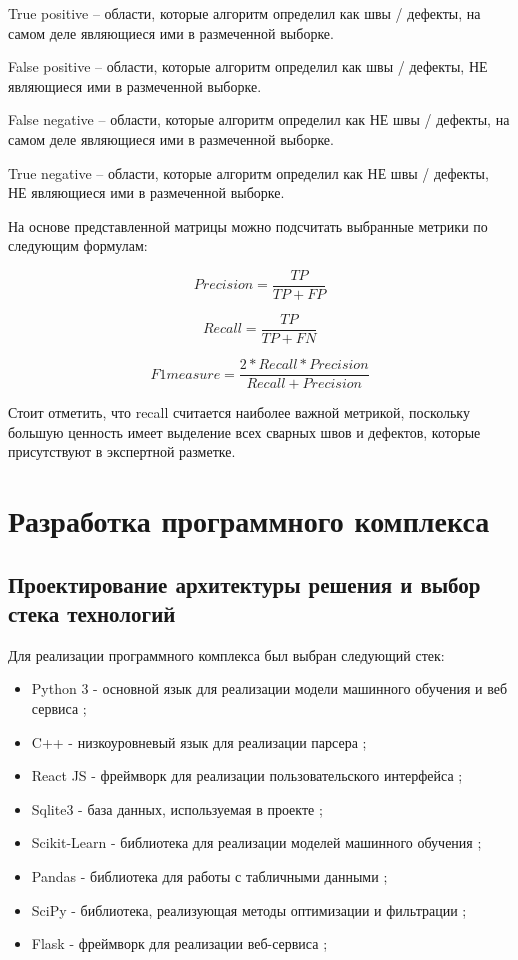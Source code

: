 \documentclass[a4paper,article,14pt]{extarticle}
\begin{document}
True positive – области, которые алгоритм определил как швы / дефекты, на самом деле являющиеся ими в размеченной выборке.

False positive – области, которые алгоритм определил как швы / дефекты, НЕ являющиеся ими в размеченной выборке.

False negative – области, которые алгоритм определил как НЕ швы / дефекты, на самом деле являющиеся ими в размеченной выборке.

True negative – области, которые алгоритм определил как НЕ швы / дефекты, НЕ являющиеся ими в размеченной выборке.

На основе представленной матрицы можно подсчитать выбранные метрики по следующим формулам:

\begin{equation}
    Precision = \frac{TP}{TP+FP}
\end{equation}

\begin{equation}
    Recall = \frac{TP}{TP+FN}
\end{equation}

\begin{equation}
    F1measure = \frac{2*Recall*Precision}{Recall+Precision}
\end{equation}

Стоит отметить, что recall считается наиболее важной метрикой, поскольку большую ценность имеет выделение всех сварных швов и дефектов, которые присутствуют в экспертной разметке. 

\pagebreak
\section{Разработка программного комплекса}

\subsection{Проектирование архитектуры решения и выбор стека технологий}

Для реализации программного комплекса был выбран следующий стек:
\begin{itemize}
    \item Python 3 - основной язык для реализации модели машинного обучения и веб сервиса \cite{s5};
    \item C++ - низкоуровневый язык для реализации парсера \cite{s6};
    \item React JS - фреймворк для реализации пользовательского интерфейса \cite{s7};
    \item Sqlite3 - база данных, используемая в проекте \cite{s8};
    \item Scikit-Learn - библиотека для реализации моделей машинного обучения \cite{s9};
    \item Pandas - библиотека для работы с табличными данными \cite{s10};
    \item SciPy - библиотека, реализующая методы оптимизации и фильтрации \cite{s11};
    \item Flask - фреймворк для реализации веб-сервиса \cite{s12};
\end{itemize}
\end{document}

